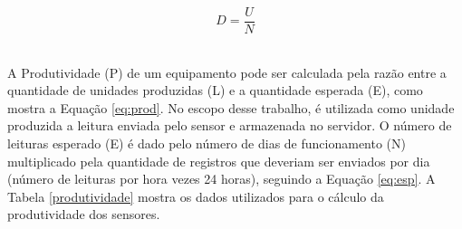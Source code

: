 \begin{equation}
  D = \frac{U}{N}
  \label{eq:disp}
\end{equation}
\newpage
\begin{center}
\label{disponibilidade}
\end{center}


\\\null \quad A Produtividade (P) de um equipamento pode ser calculada pela razão entre a quantidade de unidades produzidas (L) e a quantidade esperada (E), como mostra a Equação \ref{eq:prod}. No escopo desse trabalho, é utilizada como unidade produzida a leitura enviada pelo sensor e armazenada no servidor. O número de leituras esperado (E) é dado pelo número de dias de funcionamento (N) multiplicado pela quantidade de registros que deveriam ser enviados por dia (número de leituras por hora vezes 24 horas), seguindo a Equação \ref{eq:esp}. A Tabela \ref{produtividade} mostra os dados utilizados para o cálculo da produtividade dos sensores.

